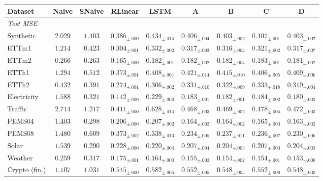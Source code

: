 \begin{tabular}{lcccccccc}
\toprule
Dataset & Naive & SNaive & RLinear & LSTM & A & B & C & D \\
\midrule
\multicolumn{9}{l}{\emph{Test MSE}} \\
Synthetic & $2.029$ & $1.403$ & $\mathbf{0.386_{\pm.000}}$ & $0.434_{\pm.014}$ & $0.406_{\pm.004}$ & $0.403_{\pm.002}$ & $0.407_{\pm.001}$ & $0.403_{\pm.007}$ \\
ETTm1 & $1.214$ & $0.423$ & $\mathbf{0.304_{\pm.001}}$ & $0.332_{\pm.002}$ & $0.317_{\pm.003}$ & $0.316_{\pm.004}$ & $0.321_{\pm.002}$ & $0.317_{\pm.007}$ \\
ETTm2 & $0.266$ & $0.263$ & $\mathbf{0.165_{\pm.000}}$ & $0.182_{\pm.001}$ & $0.182_{\pm.002}$ & $0.182_{\pm.004}$ & $0.183_{\pm.001}$ & $0.181_{\pm.002}$ \\
ETTh1 & $1.294$ & $0.512$ & $\mathbf{0.373_{\pm.001}}$ & $0.408_{\pm.001}$ & $0.421_{\pm.014}$ & $0.415_{\pm.010}$ & $0.406_{\pm.005}$ & $0.409_{\pm.006}$ \\
ETTh2 & $0.432$ & $0.391$ & $\mathbf{0.274_{\pm.001}}$ & $0.306_{\pm.002}$ & $0.331_{\pm.010}$ & $0.322_{\pm.009}$ & $0.335_{\pm.018}$ & $0.319_{\pm.004}$ \\
Electricity & $1.588$ & $0.321$ & $\mathbf{0.142_{\pm.000}}$ & $0.229_{\pm.000}$ & $0.183_{\pm.001}$ & $0.182_{\pm.001}$ & $0.184_{\pm.002}$ & $0.180_{\pm.002}$ \\
Traffic & $2.714$ & $1.217$ & $\mathbf{0.411_{\pm.000}}$ & $0.628_{\pm.014}$ & $0.468_{\pm.003}$ & $0.469_{\pm.002}$ & $0.478_{\pm.004}$ & $0.472_{\pm.003}$ \\
PEMS04 & $1.403$ & $0.298$ & $0.206_{\pm.000}$ & $0.207_{\pm.002}$ & $0.164_{\pm.002}$ & $0.164_{\pm.002}$ & $0.165_{\pm.003}$ & $\mathbf{0.163_{\pm.002}}$ \\
PEMS08 & $1.480$ & $0.609$ & $0.373_{\pm.002}$ & $0.338_{\pm.013}$ & $0.234_{\pm.005}$ & $0.237_{\pm.011}$ & $0.236_{\pm.007}$ & $\mathbf{0.230_{\pm.006}}$ \\
Solar & $1.539$ & $0.290$ & $0.228_{\pm.000}$ & $0.220_{\pm.004}$ & $0.207_{\pm.004}$ & $\mathbf{0.204_{\pm.003}}$ & $0.207_{\pm.003}$ & $0.204_{\pm.003}$ \\
Weather & $0.259$ & $0.317$ & $0.175_{\pm.001}$ & $0.164_{\pm.000}$ & $0.155_{\pm.002}$ & $0.154_{\pm.002}$ & $0.154_{\pm.001}$ & $\mathbf{0.153_{\pm.000}}$ \\
Crypto (fin.) & $1.107$ & $1.031$ & $\mathbf{0.545_{\pm.000}}$ & $0.582_{\pm.005}$ & $0.552_{\pm.005}$ & $0.548_{\pm.005}$ & $0.552_{\pm.006}$ & $0.548_{\pm.003}$ \\

\end{tabular}
